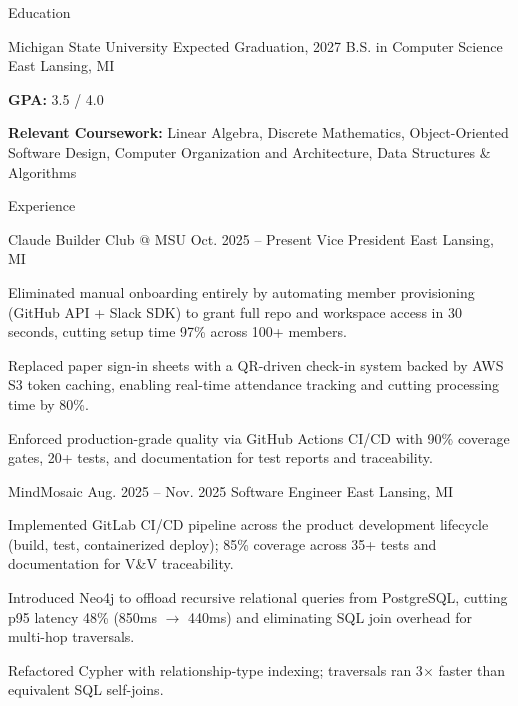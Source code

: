 \documentclass[
	11pt
]{../../../resume}
\begin{document}
	\begin{rSection}{E}{ducation}
		\begin{rSectionEntry}
			{Michigan State University}
			{Expected Graduation, 2027}
			{B.S. in Computer Science}
			{}
			{East Lansing, MI}

			\item \textbf{GPA:} 3.5 / 4.0
			\item \textbf{Relevant Coursework:} Linear Algebra, Discrete Mathematics, Object-Oriented Software Design, Computer Organization and Architecture, Data Structures \& Algorithms
		\end{rSectionEntry}
	\end{rSection}

	\begin{rSection}{E}{xperience}
		\begin{rSectionEntry}
			{Claude Builder Club @ MSU}
			{Oct. 2025 -- Present}
			{Vice President}
			{}
			{East Lansing, MI}

			\item Eliminated manual onboarding entirely by automating member provisioning (GitHub API + Slack SDK) to grant full repo and workspace access in 30 seconds, cutting setup time 97\% across 100+ members.
			\item Replaced paper sign-in sheets with a QR-driven check-in system backed by AWS S3 token caching, enabling real-time attendance tracking and cutting processing time by 80\%.
			\item Enforced production-grade quality via GitHub Actions CI/CD with 90\% coverage gates, 20+ tests, and documentation for test reports and traceability.
		\end{rSectionEntry}

		\begin{rSectionEntry}
			{MindMosaic}
			{Aug. 2025 -- Nov. 2025}
			{Software Engineer}
			{}
			{East Lansing, MI}

			\item Implemented GitLab CI/CD pipeline across the product development lifecycle (build, test, containerized deploy); 85\% coverage across 35+ tests and documentation for V\&V traceability.
			\item Introduced Neo4j to offload recursive relational queries from PostgreSQL, cutting p95 latency 48\% (850ms $\rightarrow$ 440ms) and eliminating SQL join overhead for multi-hop traversals.
			\item Refactored Cypher with relationship-type indexing; traversals ran 3$\times$ faster than equivalent SQL self-joins.
		\end{rSectionEntry}
	\end{rSection}
\end{document}
